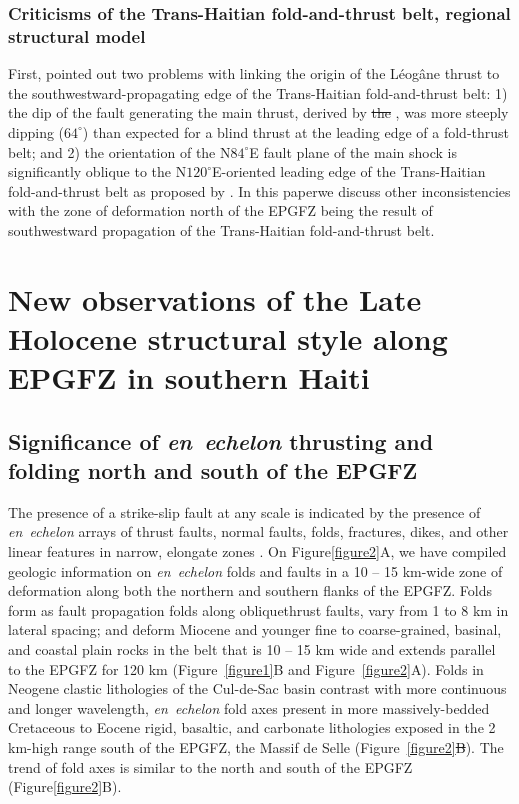 \documentclass[linenumbers,draft]{agujournal}
\providecommand{\DIFadd}[1]{{\protect\color{blue}\uwave{#1}}} %
\providecommand{\DIFdel}[1]{{\protect\color{red}\sout{#1}}}                      %
\providecommand{\DIFaddbegin}{} %
\providecommand{\DIFaddend}{} %
\providecommand{\DIFdelbegin}{} %
\providecommand{\DIFdelend}{} %
\begin{document}
\subsubsection{Criticisms of the Trans-Haitian fold-and-thrust belt, regional structural model}
First, \citet{mercier20112010} pointed out two problems with linking the origin of the L\'eog\^ane thrust to the southwestward-propagating edge of the Trans-Haitian fold-and-thrust belt: 1) the dip of the fault generating the main thrust, derived by \DIFdelbegin \DIFdel{the }\DIFdelend \citet{mercier20112010}, was more steeply dipping ($64^{\circ}$) than expected for a blind thrust at the leading edge of a fold-thrust belt; and 2) the orientation of the N$84^{\circ}$E fault plane of the main shock is significantly oblique to the N$120^{\circ}$E-oriented leading edge of the Trans-Haitian fold-and-thrust belt as proposed by \citet{pubellier2000plate}. In this paper\DIFaddbegin \DIFadd{, }\DIFaddend we discuss other inconsistencies with the zone of deformation north of the EPGFZ being the result of southwestward propagation of the Trans-Haitian fold-and-thrust belt.

\section{New observations of the Late Holocene structural style along EPGFZ in southern Haiti}
\subsection{Significance of \textit{en~echelon} thrusting and folding north and south of the EPGFZ}
The presence of a strike-slip fault at any scale is indicated by the presence of \textit{en~echelon} arrays of thrust faults, normal faults, folds, fractures, dikes, and other linear features in narrow, elongate zones \citep{sylvester1988strike}. On Figure\DIFaddbegin \DIFadd{~}\DIFaddend \ref{figure2}A, we have compiled geologic information on \textit{en~echelon} folds and faults in a 10 -- 15 km-wide zone of deformation along both the northern and southern flanks of the EPGFZ. Folds form as fault propagation folds along oblique\DIFaddbegin \DIFadd{, }\DIFaddend thrust faults, vary from 1 to 8 km in lateral spacing; and deform Miocene and younger fine to coarse-grained, basinal, and coastal plain rocks in the belt that is 10 -- 15 km wide and extends parallel to the EPGFZ for 120 km (Figure~\ref{figure1}B and Figure~\ref{figure2}A). Folds in Neogene clastic lithologies of the Cul-de-Sac basin contrast with more continuous and longer wavelength, \textit{en~echelon} fold axes present in more massively-bedded Cretaceous to Eocene rigid, basaltic, and carbonate lithologies exposed in the 2 km-high range south of the EPGFZ, the Massif de Selle (Figure~\ref{figure2}\DIFdelbegin \DIFdel{B}\DIFdelend \DIFaddbegin \DIFadd{A}\DIFaddend ). The trend of fold axes is similar to the north and south of the EPGFZ (Figure\DIFaddbegin \DIFadd{~}\DIFaddend \ref{figure2}B). 
\end{document}
